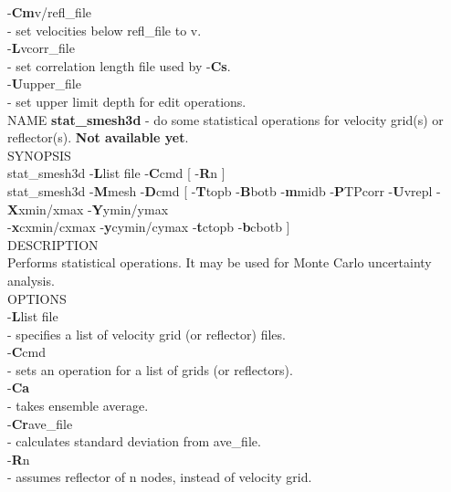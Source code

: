 \documentclass[twoside,final,onecolumn]{article}
\newcommand{\forceindent}{\leavevmode{\parindent=1em\indent}}
\begin{document}
\forceindent -\textbf{Cm}v/refl\_file \\ 
\forceindent\forceindent - set velocities below refl\_file to v.\\[6pt]
\forceindent -\textbf{L}vcorr\_file \\ 
\forceindent\forceindent - set correlation length file used by -\textbf{Cs}.\\[6pt]
\forceindent -\textbf{U}upper\_file \\ 
\forceindent\forceindent - set upper limit depth for edit operations.\\[6pt]
\newline
\newline
NAME \textbf{stat\_smesh3d} - do some statistical operations for velocity grid(s) or reflector(s). \textbf{Not available yet}.\\[6pt]
SYNOPSIS\\
\forceindent stat\_smesh3d -\textbf{L}list file -\textbf{C}cmd [ -\textbf{R}n ]\\
\forceindent stat\_smesh3d -\textbf{M}mesh -\textbf{D}cmd [ -\textbf{T}topb -\textbf{B}botb -\textbf{m}midb -\textbf{P}TPcorr -\textbf{U}vrepl -\textbf{X}xmin/xmax -\textbf{Y}ymin/ymax \\
\forceindent -\textbf{x}cxmin/cxmax -\textbf{y}cymin/cymax -\textbf{t}ctopb -\textbf{b}cbotb ]\\[6pt]
DESCRIPTION \\
\forceindent Performs statistical operations. It may be used for Monte Carlo uncertainty analysis.\\[6pt]
OPTIONS \\
\forceindent -\textbf{L}list file \\
\forceindent\forceindent - specifies a list of velocity grid (or reflector) files.\\[6pt]
\forceindent -\textbf{C}cmd \\
\forceindent\forceindent - sets an operation for a list of grids (or reflectors).\\[6pt]
\forceindent\forceindent -\textbf{Ca} \\
\forceindent\forceindent\forceindent - takes ensemble average.\\[6pt]
\forceindent\forceindent -\textbf{Cr}ave\_file \\
\forceindent\forceindent\forceindent - calculates standard deviation from ave\_file.\\[6pt]
\forceindent -\textbf{R}n \\ 
\forceindent\forceindent - assumes reflector of n nodes, instead of velocity grid.\\[6pt]
\end{document}
